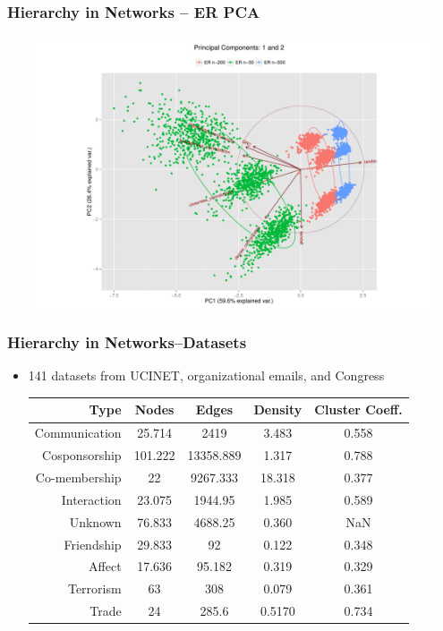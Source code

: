 \documentclass[xcolor={table}]{beamer}
\newenvironment{changemargin}[2]{%
  \begin{list}{}{%
    \setlength{\topsep}{0pt}%
    \setlength{\leftmargin}{#1}%
    \setlength{\rightmargin}{#2}%
    \setlength{\listparindent}{\parindent}%
    \setlength{\itemindent}{\parindent}%
    \setlength{\parsep}{\parskip}%
  }%
  \item[]}{\end{list}}
\begin{document}
\begin{frame}\frametitle{Hierarchy in Networks -- ER PCA}
	\begin{changemargin}{-2cm}{ -2cm}
		\centering
		\includegraphics[width=15cm, height=8cm]{images/ER_Size_PCA_Components1_2.pdf}
	\end{changemargin}
\end{frame}

\begin{frame}\frametitle{Hierarchy in Networks--Datasets}
	\begin{itemize}
		\item 141 datasets from UCINET, organizational emails, and Congress
		\vspace{.2in}
		\scriptsize
		\begin{table}
			\begin{tabular}{| r || c | c | c | c |}
				\hline
				Type & Nodes & Edges & Density & Cluster Coeff. \\
				\hline
				Communication & 25.714  &2419  &3.483 &  0.558 \\
				Cosponsorship &101.222 &13358.889  &1.317  & 0.788\\
				Co-membership & 22  &9267.333 &18.318  & 0.377\\
				Interaction & 23.075 & 1944.95 & 1.985   &  0.589\\
				Unknown & 76.833 & 4688.25 & 0.360   &  	NaN\\
				Friendship & 29.833  &  92 & 0.122    &  0.348\\
				Affect & 17.636  &  95.182 & 0.319      &	0.329\\
				Terrorism & 63 &  308 & 0.079    &  0.361\\
				Trade & 24 &  285.6 & 0.5170     &  0.734\\
				\hline
			\end{tabular}
		\end{table}
	\end{itemize}
\end{frame}
\end{document}
